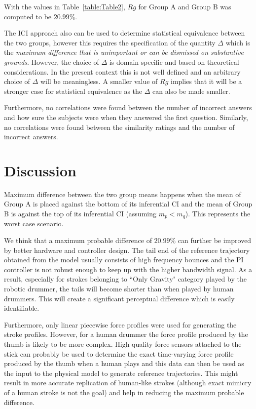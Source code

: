 \documentclass[final,1p,times]{elsarticle}
\begin{document}
With the values in Table~\ref{table:Table2}, $Rg$ for Group A and Group B was computed to be $20.99\%$. 

The ICI approach also can be used to determine statistical equivalence between the two groups, however this requires the specification of the quantity $\Delta$ which is the \textit{maximum difference that is unimportant or can be dismissed on substantive grounds}. However, the choice of $\Delta$ is domain specific and based on theoretical considerations. In the present context this is not well defined and an arbitrary choice of $\Delta$ will be meaningless. A smaller value of $Rg$ implies that it will be a stronger case for statistical equivalence as the $\Delta$ can also be made smaller. 

Furthermore, no correlations were found between
the number of incorrect answers and how sure the subjects were when they
answered the first question. Similarly, no correlations were found between
the similarity ratings and the number of incorrect answers. 
\section{Discussion}

Maximum difference between the two group means happens when the mean of Group A is placed against the bottom of its inferential CI and the mean of Group B is against the top of its inferential CI (assuming $m_p < m_q$). This represents the worst case scenario. 

We think that  a maximum probable difference of $20.99\%$ can further be improved by better hardware and controller design.
 The tail end of the reference trajectory obtained from the model usually consists of high frequency bounces and the PI controller is not robust enough to keep up with the higher bandwidth signal. As a result, especially for strokes belonging to ``Only Gravity" category played by the robotic drummer, the tails will become shorter than when played by human drummers. This will create a significant perceptual difference which is easily identifiable. 

Furthermore, only linear piecewise force profiles were used for generating the stroke profiles. However, for a human drummer the force profile produced by the thumb is likely to be more complex. High quality force sensors attached to the stick can probably be used to determine the exact time-varying force profile produced by the thumb when a human plays and this data can then be used as the input to the physical model to generate reference trajectories. This might result in more accurate replication of human-like strokes (although exact mimicry of a human stroke is not the goal) and help in reducing the maximum probable difference. 
\end{document}
